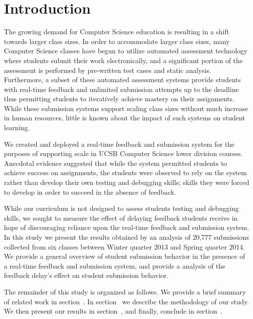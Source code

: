 \section{Introduction}
The growing demand for Computer Science education is resulting in a shift
towards larger class sizes. In order to accommodate larger class sizes, many
Computer Science classes have begun to utilize automated assessment technology
where students submit their work electronically, and a significant portion of
the assessment is performed by pre-written test cases and static
analysis. Furthermore, a subset of these automated assessment systems provide
students with real-time feedback and unlimited submission attempts up to the
deadline thus permitting students to iteratively achieve mastery on their
assignments. While these submission systems support scaling class sizes without
much increase in human resources, little is known about the impact of such
systems on student learning.

We created and deployed a real-time feedback and submission system for the
purposes of supporting scale in UCSB Computer Science lower division
courses. Anecdotal evidence suggested that while the system permitted students
to achieve success on assignments, the students were observed to rely on the
system rather than develop their own testing and debugging skills; skills they
were forced to develop in order to succeed in the absence of feedback.

While our curriculum is not designed to assess students testing and debugging
skills, we sought to measure the effect of delaying feedback students receive
in hope of discouraging reliance upon the real-time feedback and submission
system. In this study we present the results obtained by an analysis of 20,777
submissions collected from six classes between Winter quarter 2013 and Spring
quarter 2014. We provide a general overview of student submission behavior in
the presence of a real-time feedback and submission system, and provide a
analysis of the feedback delay's effect on student submission behavior.

The remainder of this study is organized as follows. We provide a brief summary
of related work in section~. In
section~ we describe the methodology of our study. We
then present our results in section~, and finally,
conclude in section~.
